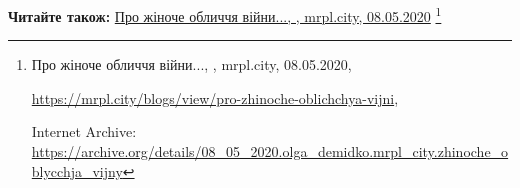  
 
 
 
 

\def\pubIA{https://archive.org/details/08_05_2020.olga_demidko.mrpl_city.zhinoche_oblycchja_vijny}
\def\pubTitle{Про жіноче обличчя війни...}
\def\pubDate{08.05.2020}
\def\pubOrigin{https://mrpl.city/blogs/view/pro-zhinoche-oblichchya-vijni}
\def\pubAuthor{\pubAuthorDemidko}

\textbf{Читайте також:} \href{\pubIA}{%
\pubTitle, \pubAuthor, mrpl.city, \pubDate}%
\footnote{\pubTitle, \pubAuthor, mrpl.city, \pubDate, \par\url{\pubOrigin}, \par Internet Archive: \url{\pubIA}}
